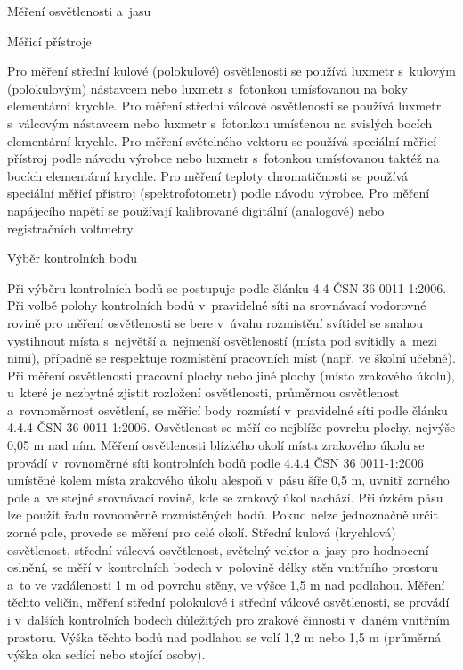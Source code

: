 \chap Měření osvětlenosti a~jasu

\sec Měřicí přístroje

Pro měření střední kulové (polokulové) osvětlenosti se používá luxmetr s~kulovým (polokulovým) nástavcem nebo luxmetr
s~fotonkou umísťovanou na boky elementární krychle. Pro měření střední válcové osvětlenosti se používá luxmetr
s~válcovým nástavcem nebo luxmetr s~fotonkou umísťenou na svislých bocích elementární krychle.
Pro měření světelného vektoru se používá speciální měřicí přístroj podle návodu výrobce nebo luxmetr s~fotonkou
umísťovanou taktéž na bocích elementární krychle. Pro měření teploty chromatičnosti se používá speciální
měřicí přístroj (spektrofotometr) podle návodu výrobce. Pro měření napájecího napětí se používají kalibrované
digitální (analogové) nebo registračních voltmetry.

\sec Výběr kontrolních bodu

Při výběru kontrolních bodů se postupuje podle článku 4.4 ČSN 36 0011-1:2006. Při volbě polohy kontrolních bodů
v~pravidelné síti na srovnávací vodorovné rovině pro měření osvětlenosti se bere v~úvahu rozmístění svítidel
se snahou vystihnout místa s~největší a~nejmenší osvětleností (místa pod svítidly a~mezi nimi), případně
se respektuje rozmístění pracovních míst (např. ve školní učebně).
\medskip
Při měření osvětlenosti pracovní plochy nebo jiné plochy (místo zrakového úkolu), u~které je nezbytné zjistit
rozložení osvětlenosti, průměrnou osvětlenost a~rovnoměrnost osvětlení, se měřicí body rozmístí v~pravidelné
síti podle článku 4.4.4 ČSN 36 0011-1:2006. Osvětlenost se měří co nejblíže povrchu plochy, nejvýše 0,05 m nad ním.
\medskip
Měření osvětlenosti blízkého okolí místa zrakového úkolu se provádí v~rovnoměrné síti kontrolních bodů
podle 4.4.4 ČSN 36 0011-1:2006 umístěné kolem místa zrakového úkolu alespoň v~pásu šíře 0,5 m, uvnitř
zorného pole a~ve stejné srovnávací rovině, kde se zrakový úkol nachází. Při úzkém pásu lze použít
řadu rovnoměrně rozmístěných bodů. Pokud nelze jednoznačně určit zorné pole, provede se měření pro celé okolí.
Střední kulová (krychlová) osvětlenost, střední válcová osvětlenost, světelný vektor a~jasy pro hodnocení
oslnění, se měří v~kontrolních bodech v~polovině délky stěn vnitřního prostoru a~to ve vzdálenosti 1 m
od povrchu stěny, ve výšce 1,5 m nad podlahou.
\medskip
Měření těchto veličin, měření střední polokulové i střední válcové osvětlenosti, se provádí i v~dalších
kontrolních bodech důležitých pro zrakové činnosti v~daném vnitřním prostoru. Výška těchto bodů nad
podlahou se volí 1,2 m nebo 1,5 m (průměrná výška oka sedící nebo stojící osoby).

